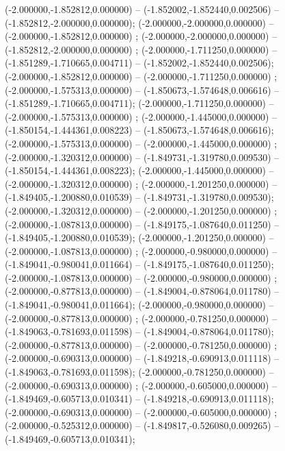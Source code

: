  (-2.000000,-1.852812,0.000000) -- (-1.852002,-1.852440,0.002506) -- (-1.852812,-2.000000,0.000000);
 (-2.000000,-2.000000,0.000000) -- (-2.000000,-1.852812,0.000000) ;
 (-2.000000,-2.000000,0.000000) -- (-1.852812,-2.000000,0.000000) ;
 (-2.000000,-1.711250,0.000000) -- (-1.851289,-1.710665,0.004711) -- (-1.852002,-1.852440,0.002506);
 (-2.000000,-1.852812,0.000000) -- (-2.000000,-1.711250,0.000000) ;
 (-2.000000,-1.575313,0.000000) -- (-1.850673,-1.574648,0.006616) -- (-1.851289,-1.710665,0.004711);
 (-2.000000,-1.711250,0.000000) -- (-2.000000,-1.575313,0.000000) ;
 (-2.000000,-1.445000,0.000000) -- (-1.850154,-1.444361,0.008223) -- (-1.850673,-1.574648,0.006616);
 (-2.000000,-1.575313,0.000000) -- (-2.000000,-1.445000,0.000000) ;
 (-2.000000,-1.320312,0.000000) -- (-1.849731,-1.319780,0.009530) -- (-1.850154,-1.444361,0.008223);
 (-2.000000,-1.445000,0.000000) -- (-2.000000,-1.320312,0.000000) ;
 (-2.000000,-1.201250,0.000000) -- (-1.849405,-1.200880,0.010539) -- (-1.849731,-1.319780,0.009530);
 (-2.000000,-1.320312,0.000000) -- (-2.000000,-1.201250,0.000000) ;
 (-2.000000,-1.087813,0.000000) -- (-1.849175,-1.087640,0.011250) -- (-1.849405,-1.200880,0.010539);
 (-2.000000,-1.201250,0.000000) -- (-2.000000,-1.087813,0.000000) ;
 (-2.000000,-0.980000,0.000000) -- (-1.849041,-0.980041,0.011664) -- (-1.849175,-1.087640,0.011250);
 (-2.000000,-1.087813,0.000000) -- (-2.000000,-0.980000,0.000000) ;
 (-2.000000,-0.877813,0.000000) -- (-1.849004,-0.878064,0.011780) -- (-1.849041,-0.980041,0.011664);
 (-2.000000,-0.980000,0.000000) -- (-2.000000,-0.877813,0.000000) ;
 (-2.000000,-0.781250,0.000000) -- (-1.849063,-0.781693,0.011598) -- (-1.849004,-0.878064,0.011780);
 (-2.000000,-0.877813,0.000000) -- (-2.000000,-0.781250,0.000000) ;
 (-2.000000,-0.690313,0.000000) -- (-1.849218,-0.690913,0.011118) -- (-1.849063,-0.781693,0.011598);
 (-2.000000,-0.781250,0.000000) -- (-2.000000,-0.690313,0.000000) ;
 (-2.000000,-0.605000,0.000000) -- (-1.849469,-0.605713,0.010341) -- (-1.849218,-0.690913,0.011118);
 (-2.000000,-0.690313,0.000000) -- (-2.000000,-0.605000,0.000000) ;
 (-2.000000,-0.525312,0.000000) -- (-1.849817,-0.526080,0.009265) -- (-1.849469,-0.605713,0.010341);
